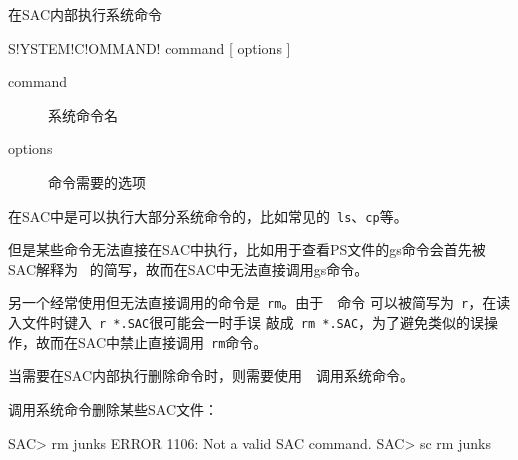 \label{cmd:systemcommand}

在SAC内部执行系统命令

\begin{SACSTX}
S!YSTEM!C!OMMAND! command [ options ]
\end{SACSTX}

\begin{description}
\item [command] 系统命令名
\item [options] 命令需要的选项
\end{description}

在SAC中是可以执行大部分系统命令的，比如常见的~\verb+ls+、\verb+cp+等。

但是某些命令无法直接在SAC中执行，比如用于查看PS文件的gs命令会首先被SAC解释为
~的简写，故而在SAC中无法直接调用gs命令。

另一个经常使用但无法直接调用的命令是~\verb+rm+。由于~~命令
可以被简写为~\verb+r+，在读入文件时键入~\verb+r *.SAC+很可能会一时手误
敲成~\verb+rm *.SAC+，为了避免类似的误操作，故而在SAC中禁止直接调用~\verb+rm+命令。

当需要在SAC内部执行删除命令时，则需要使用~~调用系统命令。

调用系统命令删除某些SAC文件：
\begin{SACCode}
SAC> rm junks
 ERROR 1106: Not a valid SAC command.
SAC> sc rm junks
\end{SACCode}
